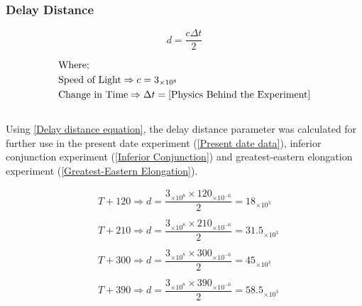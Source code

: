 \documentclass[11pt]{article}
\begin{document}
\begin{multicols}{2}
\addtolength{}
\addtolength{}

\subsubsection{Delay Distance}

\begin{equation} \label{Delay distance equation}
{d = \dfrac{c \Delta t }{2}}
\end{equation}

\begin{equation*}
\begin{split}
&\text{Where;} \\
&\text{Speed of Light} \Rightarrow c=3_{\times10^8} \\
&\text{Change in Time} \Rightarrow \Delta t = \text{\cref{Physics Behind the Experiment}} \\
\end{split}
\end{equation*} \\

Using \cref{Delay distance equation}, the delay distance parameter was calculated for further use in the present date experiment (\cref{Present date data}), inferior conjunction experiment (\cref{Inferior Conjunction}) and greatest-eastern elongation experiment (\cref{Greatest-Eastern Elongation}). 

\begin{equation}\label{Delay distance parameter}
\begin{split}
&T + 120 \Rightarrow {d = \dfrac{3_{\times10^8} \times 120_{\times10^{-6}}}{2}=18_{\times10^3}} \\       
\\
&T + 210 \Rightarrow {d = \dfrac{3_{\times10^8} \times 210_{\times10^{-6}}}{2}=31.5_{\times10^3}} \\
\\
&T + 300 \Rightarrow {d = \dfrac{3_{\times10^8} \times 300_{\times10^{-6}}}{2}=45_{\times10^3}} \\
\\
&T + 390 \Rightarrow {d = \dfrac{3_{\times10^8} \times 390_{\times10^{-6}}}{2}=58.5_{\times10^3}} \\
\\
\end{split}
\end{equation}



\end{multicols}
\end{document}
